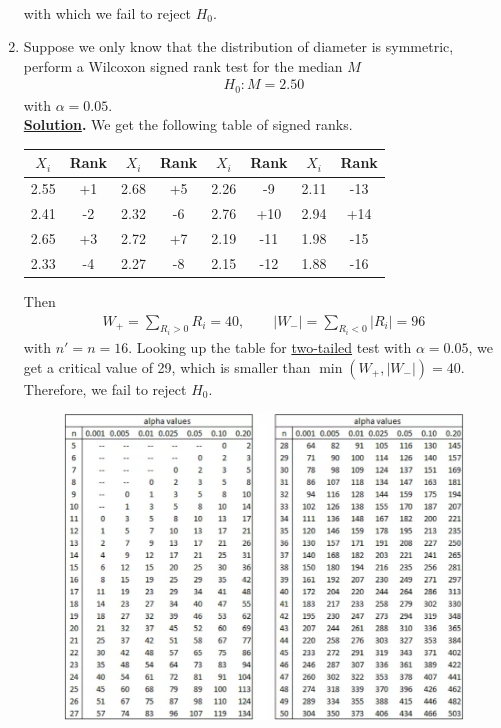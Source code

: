 \begin{enumerate}
\begin{align*}
	\end{align*}
	with which we fail to reject $H_0$.
	\item Suppose we only know that the distribution of diameter is symmetric, perform a Wilcoxon signed rank test for the median $M$
	\begin{align*}
	H_0: M = 2.50
	\end{align*}
	with $\alpha = 0.05$. \\
	\textbf{\underline{Solution}.} We get the following table of signed ranks.
	\begin{table}[H]
		\centering
		\begin{tabular}{cc|cc|cc|cc}
			\hline
			$X_i$ & Rank & $X_i$ & Rank & $X_i$ & Rank & $X_i$ & Rank \\
			\hline
			2.55 & +1 & 2.68 & +5 & 2.26 & -9 & 2.11 & -13 \\
			2.41 & -2 & 2.32 & -6 & 2.76 & +10 & 2.94 & +14 \\
			2.65 & +3 & 2.72 & +7 & 2.19 & -11 & 1.98 & -15 \\
			2.33 & -4 & 2.27 & -8 & 2.15 & -12 & 1.88 & -16 \\
			\hline
		\end{tabular}
	\end{table}
	Then
	\begin{align*}
	W_+ = \sum_{R_i > 0} R_i = 40, \qquad |W_-| = \sum_{R_i < 0} |R_i| = 96
	\end{align*}
	with $n' = n = 16$. Looking up the table for \underline{two-tailed} test with $\alpha=0.05$, we get a critical value of 29, which is smaller than $\min(W_+, |W_-|) = 40$. Therefore, we fail to reject $H_0$.
	\begin{figure}[H]
		\centering
		\includegraphics[width=14cm]{./images/s5fig3.png}

\end{figure}
\end{enumerate}
